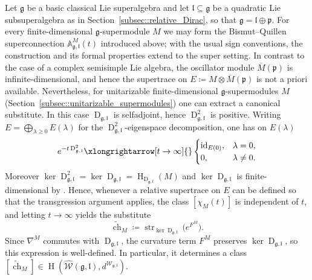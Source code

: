 \documentclass[11pt]{amsart}
\newcommand{\str}{\operatorname{str}}
\newcommand{\id}{\operatorname{id}}
\newcommand{\Dirac}{\operatorname{D}}
\def\WW{{\mathcal{W}}}
\def\pp{{\mathfrak p}}
\def\H{{\operatorname{H}}}
\def\ll{{\mathfrak l}}
\def \AA {{\mathbb{A}}}
\def\pp{{\mathfrak p}}
\def\pp{{\mathfrak{p}}}
\def\gg{{\mathfrak{g}}}
\theoremstyle{plain}
\theoremstyle{remark}
\theoremstyle{definition}
\numberwithin{equation}{section}
\theoremstyle{remark}
\begin{document}
Let $\gg$ be a basic classical Lie superalgebra and let $\ll\subseteq\gg$ be a quadratic Lie subsuperalgebra as in Section~\ref{subsec::relative_Dirac}, so that $\gg=\ll\oplus\pp$. For every finite-dimensional $\gg$-supermodule $M$ we may form the Bismut--Quillen superconnection $\AA^M_{\gg,\ll}(t)$ introduced above; with the usual sign conventions, the construction and its formal properties extend to the super setting. In contrast to the case of a complex semisimple Lie algebra, the oscillator module $\overline{M}(\pp)$ is infinite-dimensional, and hence the supertrace on $E\coloneqq M\otimes\overline{M}(\pp)$ is not a priori available. Nevertheless, for unitarizable finite-dimensional $\gg$-supermodules $M$ (Section~\ref{subsec::unitarizable_supermodules}) one can extract a canonical substitute. In this case $\Dirac_{\gg,\ll}$ is selfadjoint, hence $\Dirac_{\gg,\ll}^2$ is positive. Writing $E=\bigoplus_{\lambda\ge0}E(\lambda)$ for the $\Dirac_{\gg,\ll}^2$-eigenspace decomposition, one has on $E(\lambda)$
\[
e^{-t\Dirac_{\gg,\ll}^2}\xlongrightarrow[t\to\infty]{}\begin{cases}\id_{E(0)},&\lambda=0,\\0,&\lambda\neq0.\end{cases}
\]
Moreover $\ker\Dirac_{\gg,\ll}^2=\ker\Dirac_{\gg,\ll}=\H_{\Dirac_{\gg,\ll}}(M)$ and $\ker\Dirac_{\gg,\ll}$ is finite-dimensional by \cite{Schmidt_Noja}. Hence, whenever a relative supertrace on $E$ can be defined so that the transgression argument applies, the class $[\chi_M(t)]$ is independent of $t$, and letting $t\to\infty$ yields the substitute
\begin{equation}
\widetilde{\operatorname{ch}}_M\coloneqq \str_{\ker\Dirac_{\gg,\ll}}\!\bigl(e^{F^M}\bigr).
\end{equation}
Since $\nabla^M$ commutes with $\Dirac_{\gg,\ll}$, the curvature term $F^M$ preserves $\ker\Dirac_{\gg,\ll}$, so this expression is well-defined. In particular, it determines a class $[\widetilde{\operatorname{ch}}_M]\in \H(\widehat{\WW}(\gg,\ll),d^{\WW_{\gg,\ll}})$.

\thispagestyle{empty}





\end{document}
